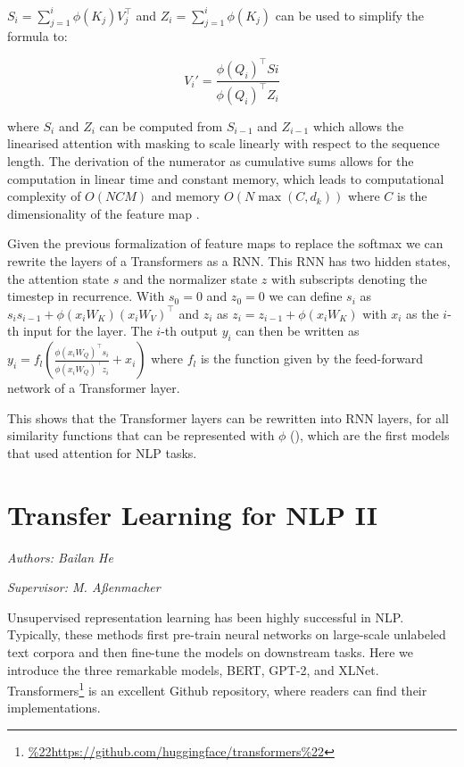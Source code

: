 \documentclass[]{krantz}
\renewcommand{\href}[2]{#2\footnote{\url{#1}}}
\begin{document}
\(S_i = \sum_{j=1}^i\phi(K_j)V_j^\top\) and \(Z_i = \sum_{j=1}^i\phi(K_j)\) can be used to simplify the formula to:

\[
V_i' = \frac{\phi(Q_i)^\top Si}{\phi(Q_i)^\top Z_i}
\]

where \(S_i\) and \(Z_i\) can be computed from \(S_{i-1}\) and \(Z_{i-1}\) which allows the linearised attention
with masking to scale linearly with respect to the sequence length. The derivation of
the numerator as cumulative sums allows for the computation in linear time and constant memory,
which leads to computational complexity of \(O(NCM)\) and memory \(O(N \max{(C,d_k)})\) where \(C\) is the dimensionality of
the feature map \citet{katharopoulos2020transformers}.

Given the previous formalization of feature maps to replace the softmax we can rewrite the
layers of a Transformers as a RNN. This RNN has two hidden states, the attention state \(s\) and the
normalizer state \(z\) with subscripts denoting the timestep in recurrence.
With \(s_0 = 0\) and \(z_0 = 0\) we can define \(s_i\) as \(s_i s_{i-1} + \phi(x_iW_K)(x_iW_V)^\top\) and
\(z_i\) as \(z_i = z_{i-1} + \phi(x_iW_K)\) with \(x_i\) as the \(i\)-th input for the layer.
The \(i\)-th output \(y_i\) can then be written as \(y_i = f_l(\frac{\phi(x_iW_Q)^\top s_i}{\phi(x_iW_Q)^\top z_i} + x_i)\)
where \(f_l\) is the function given by the feed-forward network of a Transformer layer.

This shows that the Transformer layers can be rewritten into RNN layers, for all similarity functions
that can be represented with \(\phi\) (\citet{katharopoulos2020transformers}), which are the first models
that used attention for NLP tasks.

\hypertarget{transfer-learning-for-nlp-ii}{%
\chapter{Transfer Learning for NLP II}\label{transfer-learning-for-nlp-ii}}

\emph{Authors: Bailan He}

\emph{Supervisor: M. Aßenmacher}

Unsupervised representation learning has been highly successful in NLP. Typically, these methods first pre-train neural networks on large-scale unlabeled text corpora and then fine-tune the models on downstream tasks. Here we introduce the three remarkable models, BERT, GPT-2, and XLNet. \href{\%22https://github.com/huggingface/transformers\%22}{Transformers} is an excellent Github repository, where readers can find their implementations.
\end{document}
